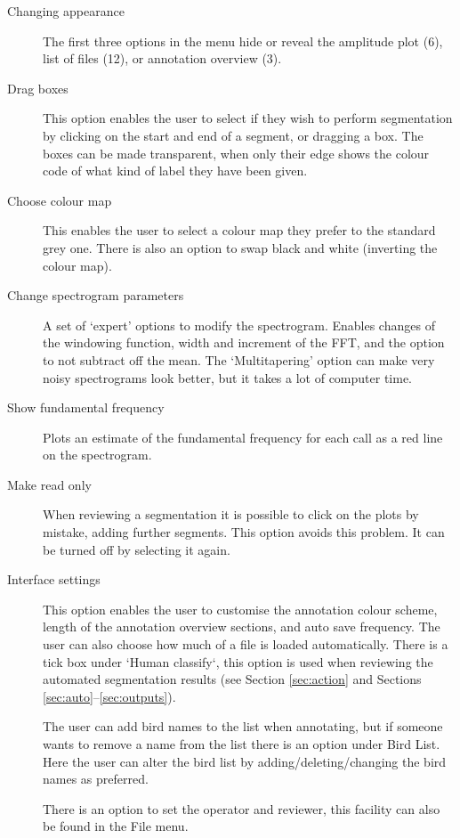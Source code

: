 \documentclass{article}
\begin{document}
\begin{description}
\item [Changing appearance] The first three options in the menu hide or reveal the amplitude plot (6), list of files (12), or annotation overview (3). 
\item [Drag boxes] This option enables the user to select if they wish to perform segmentation by clicking on the start and end of a segment, or dragging a box. The boxes can be made transparent, when only their edge shows the colour code of what kind of label they have been given.
\item [Choose colour map] This enables the user to select a colour map they prefer to the standard grey one. There is also an option to swap black and white (inverting the colour map). 
\item [Change spectrogram parameters] A set of `expert' options to modify the spectrogram. Enables changes of the windowing function, width and increment of the FFT, and the option to not subtract off the mean. The `Multitapering' option can make very noisy spectrograms look better, but it takes a lot of computer time. 
\item [Show fundamental frequency] Plots an estimate of the fundamental frequency for each call as a red line on the spectrogram.
\item [Make read only] When reviewing a segmentation it is possible to click on the plots by mistake, adding further segments. This option avoids this problem. It can be turned off by selecting it again. 
\item [Interface settings] This option enables the user to customise the annotation colour scheme, length of the annotation overview sections, and auto save frequency. The user can also choose how much of a file is loaded automatically. There is a tick box under `Human classify`, this option is used when reviewing the automated segmentation results  (see Section \ref{sec:action} and Sections \ref{sec:auto}--\ref{sec:outputs}).

The user can add bird names to the list when annotating, but if someone wants to remove a name from the list there is an option under Bird List. Here the user can alter the bird list by adding/deleting/changing the bird names as preferred. 

There is an option to set the operator and reviewer, this facility can also be found in the File menu.
\end{description}
\end{document}

